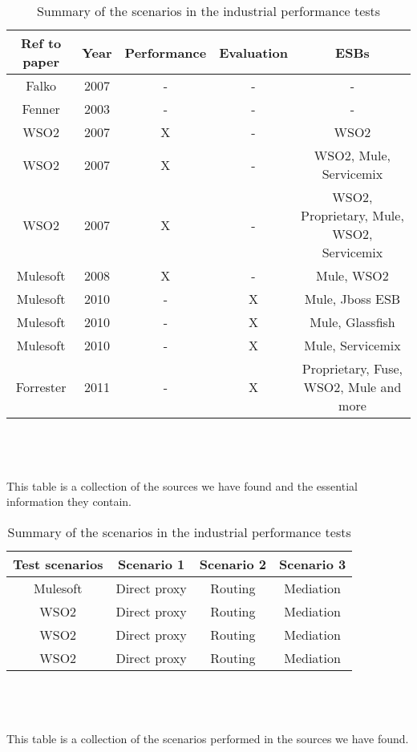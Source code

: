 \begin{table}[H]
	\caption{Summary of industrial papers and what tests they perform}
	\begin{tabular}{c c c c c}

		Ref to paper & Year & Performance & Evaluation & ESBs \\ 
		\hline	
		Falko \cite{falko07} & 2007 & - & - & - \\ 
		Fenner \cite{fenner03} & 2003 & - & - & - \\
		WSO2 \cite{Perera07} & 2007 & X & - & WSO2 \\
		WSO2 \cite{Perera07R2} & 2007 & X & - & WSO2, Mule, Servicemix\\
		WSO2 \cite{Perera07R3} & 2007 & X & - & WSO2, Proprietary, Mule, WSO2, Servicemix \\
		Mulesoft \cite{mulesoft08} & 2008 & X & - & Mule, WSO2\\
		Mulesoft \cite{mulevsjboss} & 2010 & - & X & Mule, Jboss ESB\\
		Mulesoft \cite{mulevsglassfish} & 2010 & - & X & Mule, Glassfish \\
		Mulesoft \cite{mulevsservicemix} & 2010 & - & X & Mule, Servicemix \\
		Forrester \cite{forrester11} & 2011 & - & X & Proprietary, Fuse, WSO2, Mule and more\\
		\hline
	\end{tabular}
	\\
	\\
	\\
	This table is a collection of the sources we have found and the essential information they contain.

	\caption{Summary of the scenarios in the industrial performance tests}
	\begin{tabular}{c c c c}
		\hline
		Test scenarios & Scenario 1 & Scenario 2 & Scenario 3 \\
		\hline
		Mulesoft \cite{mulesoft08} & Direct proxy & Routing & Mediation \\	
		WSO2 \cite{Perera07} & Direct proxy & Routing & Mediation \\
		WSO2 \cite{Perera07R2} & Direct proxy & Routing & Mediation \\
		WSO2 \cite{Perera07R3} & Direct proxy & Routing & Mediation \\
		\hline
	\end{tabular}
	\\
	\\
	\\
	This table is a collection of the scenarios performed in the sources we have found. 
	

\end{table}
